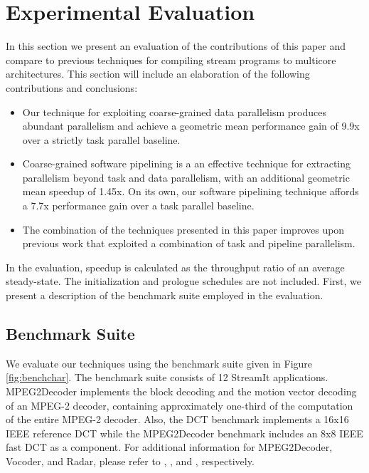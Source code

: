\section{Experimental Evaluation}

In this section we present an evaluation of the contributions of this
paper and compare to previous techniques for compiling stream programs
to multicore architectures.  This section will include an elaboration
of the following contributions and conclusions:

\begin{itemize}
\item Our technique for exploiting coarse-grained data parallelism
produces abundant parallelism and achieve a geometric mean performance
gain of 9.9x over a strictly task parallel baseline.
\item Coarse-grained software pipelining is a
an effective technique for extracting parallelism beyond task and data
parallelism, with an additional geometric mean speedup of 1.45x. On
its own, our software pipelining technique affords a 7.7x performance
gain over a task parallel baseline.
\item The combination of the techniques presented in this paper
improves upon previous work that exploited a combination of task and
pipeline parallelism.
\end{itemize}

In the evaluation, speedup is calculated as the throughput ratio of an
average steady-state.  The initialization and prologue schedules are
not included.  First, we present a description of the benchmark suite
employed in the evaluation.

\begin{figure*}[t]
\centering
{}
\caption{Benchmark characteristics
\protect\label{fig:benchchar}}
\end{figure*}

\subsection{Benchmark Suite}
We evaluate our techniques using the benchmark suite given in Figure
\ref{fig:benchchar}.   The benchmark suite consists of 12 StreamIt
applications. MPEG2Decoder implements the block decoding and the
motion vector decoding of an MPEG-2 decoder, containing approximately
one-third of the computation of the entire MPEG-2 decoder.  Also, the
DCT benchmark implements a 16x16 IEEE reference DCT while the
MPEG2Decoder benchmark includes an 8x8 IEEE fast DCT as a component.
For additional information for MPEG2Decoder, Vocoder, and Radar,
please refer to \cite{ipdps2006},
\cite{seneff80}, and \cite{pca}, respectively. 

